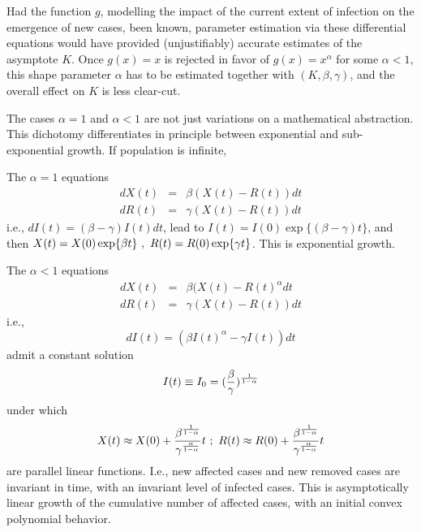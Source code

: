 \documentclass{article}
\begin{document}
Had the function $g$, modelling the impact of the current extent of infection on the emergence of new cases, been known, parameter estimation via these differential equations would have provided (unjustifiably) accurate estimates of the asymptote $K$. Once $g(x)=x$ is rejected in favor of \linebreak $g(x)=x^\alpha$ for some $\alpha<1$, this shape parameter $\alpha$ has to be estimated together with $(K , \beta, \gamma)$, and the overall effect on $K$ is less clear-cut.

\bigskip

 The cases $\alpha=1$ and $\alpha<1$ are not just variations on a mathematical abstraction. This dichotomy differentiates in principle between exponential and sub-exponential growth. If population is infinite,

The $\alpha=1$ equations
\begin{eqnarray}
d X(t) & = & \beta (X(t)-R(t)) dt \label{DEforX1} \\
d R(t) & = & \gamma (X(t)-R(t)) dt \label{DEforR1}
\end{eqnarray}
i.e., $d I(t) = (\beta-\gamma) I(t) dt$, lead to $I(t)=I(0)\exp\{(\beta-\gamma)t\}$, and then $X(t)=X(0)\exp\{\beta t\} \ , \ \linebreak R(t)=R(0)\exp\{\gamma t\}$. This is exponential growth.

The $\alpha<1$ equations
\begin{eqnarray}
dX(t) & = & \beta (X(t)-R(t)^\alpha dt \label{DEforX2} \\
dR(t) & = & \gamma (X(t)-R(t)) dt \label{DEforR2}
\end{eqnarray}
i.e.,
\begin{equation} 
\label{DEforI}
d I(t) = (\beta I(t)^\alpha - \gamma I(t))dt
\end{equation}
admit a constant solution
\begin{equation} 
\label{Isub0}
I(t) \equiv I_0 = ({\beta \over \gamma})^{1 \over {1-\alpha}}
\end{equation}
under which
\begin{equation} 
\label{slopes}
X(t) \approx X(0)+{{\beta^{1 \over {1-\alpha}}} \over {\gamma^{\alpha \over {1-\alpha}}}} t  \ ; \ R(t) \approx R(0)+{{\beta^{1 \over {1-\alpha}}} \over {\gamma^{\alpha \over {1-\alpha}}}} t
\end{equation}
are parallel linear functions. I.e., new affected cases and new removed cases are invariant in time, with an invariant level of infected cases.
This is asymptotically linear growth of the cumulative number of affected cases, with an initial convex polynomial behavior.
\end{document}
